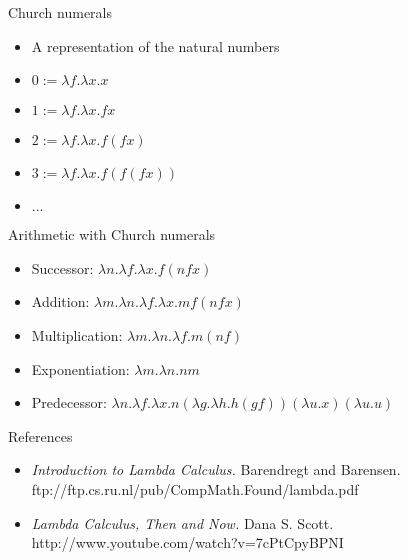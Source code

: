 \documentclass{beamer}
\begin{document}
\begin{frame}{Church numerals}
\begin{itemize}
\item A representation of the natural numbers
\item $0 := \lambda f.\lambda x.x$
\item $1 := \lambda f.\lambda x.f x$
\item $2 := \lambda f.\lambda x.f (f x)$
\item $3 := \lambda f.\lambda x.f (f (f x))$
\item $\ldots$
\end{itemize}
\end{frame}

\begin{frame}{Arithmetic with Church numerals}
\begin{itemize}
\item Successor: $\lambda n.\lambda f.\lambda x. f (n f x)$
\item Addition: $\lambda m.\lambda n.\lambda f.\lambda x. m f (n f x)$
\item Multiplication: $\lambda m.\lambda n.\lambda f. m (n f)$
\item Exponentiation: $\lambda m.\lambda n. n m$
\item Predecessor: $\lambda n.\lambda f.\lambda x. n (\lambda g.\lambda h. h (g f)) (\lambda u. x) (\lambda u. u)$
\end{itemize}
\end{frame}


\begin{frame}{References}
\begin{itemize}
\item \emph{Introduction to Lambda Calculus.} Barendregt and Barensen.
ftp://ftp.cs.ru.nl/pub/CompMath.Found/lambda.pdf
\item \emph{Lambda Calculus, Then and Now.} Dana S. Scott. http://www.youtube.com/watch?v=7cPtCpyBPNI
\end{itemize}
\end{frame}
\end{document}

